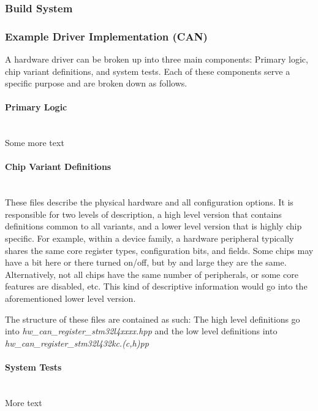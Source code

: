 \documentclass[10pt, letterpaper, tikz]{article}
\begin{document}
  \subsubsection{Build System}

  \subsubsection{Example Driver Implementation (CAN)}

  \par
    A hardware driver can be broken up into three main components: Primary logic, chip variant definitions, and system tests.
    Each of these components serve a specific purpose and are broken down as follows.

    \paragraph{Primary Logic}\mbox{}\\
    Some more text
    \par

  \paragraph{Chip Variant Definitions}\mbox{}\\
    These files describe the physical hardware and all configuration options. It is responsible for
    two levels of description, a high level version that contains definitions common to all variants, and a
    lower level version that is highly chip specific. For example, within a device family, a hardware peripheral
    typically shares the same core register types, configuration bits, and fields. Some chips may have a bit here
    or there turned on/off, but by and large they are the same. Alternatively, not all chips have the same number
    of peripherals, or some core features are disabled, etc. This kind of descriptive information would go into the
    aforementioned lower level version.

  \par
    The structure of these files are contained as such: The high level definitions go into \emph{hw\_can\_register\_stm32l4xxxx.hpp}
    and the low level definitions into \emph{hw\_can\_register\_stm32l432kc.(c,h)pp}

  \par


  \paragraph{System Tests}\mbox{}\\
    More text
  \par


  \begin{lstlisting}

  \end{lstlisting}
\end{document}
